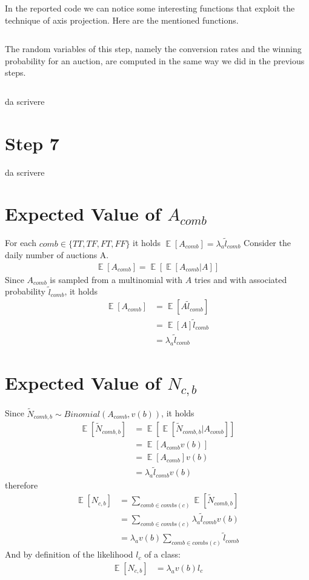 \documentclass[11pt]{article} %
\DeclareMathOperator{\EX}{\mathbb{E}}
\begin{document}
In the reported code we can notice some interesting functions that exploit the technique of axis projection. Here are the
mentioned functions.
\inputminted{python}{code/step6_axis_projected_quantities.py}

The random variables of this step, namely the conversion rates and the winning probability for an auction, are computed
in the same way we did in the previous steps.
\inputminted{python}{code/step6_random_variables_computation.py}

{\color{red}da scrivere}


\clearpage
\section{Step 7}
{\color{red}da scrivere}


\clearpage
\appendix

\section{Expected Value of $A_{comb}$}\label{sec.acombproof}
For each $comb \in \{TT,TF,FT,FF\}$ it holds $\EX[A_{comb}] = \lambda_a \tilde{l}_{comb}$
\newline
\newline
Consider the daily number of auctions A.
\begin{align*}
\EX\left[A_{comb}\right] = \EX\left[\EX\left[A_{comb}|A\right]\right]
\end{align*}
Since $A_{comb}$ is sampled from a multinomial with $A$ tries and with associated probability $\tilde{l}_{comb}$, it holds
\begin{align*}
\EX\left[A_{comb}\right] &= \EX\left[A\tilde{l}_{comb}\right]\\
&= \EX\left[A\right]\tilde{l}_{comb}\\
&= \lambda_a\tilde{l}_{comb}
\end{align*}

\section{Expected Value of $N_{c,b}$}\label{sec.ncbproof}
Since $\tilde{N}_{comb,b} \sim Binomial(A_{comb}, v(b))$, it holds
\begin{align*}
\EX\left[\tilde{N}_{comb,b}\right] &= \EX\left[\EX\left[\tilde{N}_{comb,b}| A_{comb}\right]\right]\\
 &= \EX\left[A_{comb}v(b)\right]\\
 &= \EX\left[A_{comb}\right]v(b)\\
&= \lambda_a\tilde{l}_{comb}v(b)
\end{align*}
therefore
\begin{align*}
\EX\left[N_{c,b}\right] &= \sum_{comb \in combs(c)}{\EX\left[\tilde{N}_{comb,b}\right]}\\
&= \sum_{comb \in combs(c)}{\lambda_a\tilde{l}_{comb}v(b)}\\
&= \lambda_av(b)\sum_{comb \in combs(c)}{\tilde{l}_{comb}}
\end{align*}
And by definition of the likelihood $l_c$ of a class:
\begin{align*}
\EX\left[N_{c,b}\right]&= \lambda_av(b)l_c
\end{align*}
\end{document}
